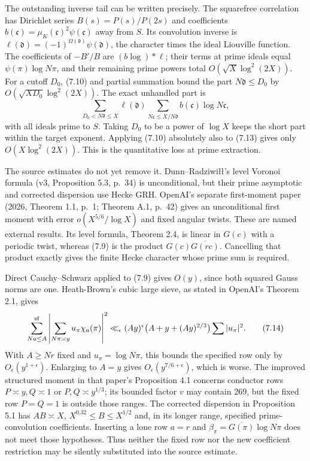 \documentclass[11pt]{article}
\begin{document}
The outstanding inverse tail can be written precisely. The squarefree correlation has Dirichlet series $B(s)=P(s)/P(2s)$ and coefficients $b(\mathfrak c)=\mu_K(\mathfrak c)^2\psi(\mathfrak c)$ away from $S$. Its convolution inverse is $\ell(\mathfrak d)=(-1)^{\Omega(\mathfrak d)}\psi(\mathfrak d)$, the character times the ideal Liouville function. The coefficients of $-B'/B$ are $(b\log)*\ell$; their terms at prime ideals equal $\psi(\pi)\log N\pi$, and their remaining prime powers total $O(\sqrt X\log^2(2X))$. For a cutoff $D_0$, (7.10) and partial summation bound the part $N\mathfrak d\le D_0$ by $O(\sqrt{XD_0}\log^2(2X))$. The exact unhandled part is
\[
 \sum_{D_0<N\mathfrak d\le X}\ell(\mathfrak d)
       \sum_{N\mathfrak c\le X/N\mathfrak d}
             b(\mathfrak c)\log N\mathfrak c,
 \tag{7.13}
\]
with all ideals prime to $S$. Taking $D_0$ to be a power of $\log X$ keeps the short part within the target exponent. Applying (7.10) absolutely also to (7.13) gives only $O(X\log^2(2X))$. This is the quantitative loss at prime extraction.

The source estimates do not yet remove it. Dunn--Radziwi\l\l's level Voronoi formula (v3, Proposition 5.3, p.~34) is unconditional, but their prime asymptotic and corrected dispersion use Hecke GRH. OpenAI's separate first-moment paper (2026, Theorem 1.1, p.~1; Theorem A.1, p.~42) gives an unconditional first moment with error $o(X^{5/6}/\log X)$ and fixed angular twists. These are named external results. Its level formula, Theorem 2.4, is linear in $G(c)$ with a periodic twist, whereas (7.9) is the product $G(c)\overline{G(rc)}$. Cancelling that product exactly gives the finite Hecke character whose prime sum is required.

Direct Cauchy--Schwarz applied to (7.9) gives $O(y)$, since both squared Gauss norms are one. Heath-Brown's cubic large sieve, as stated in OpenAI's Theorem 2.1, gives
\[
 \sum_{Na\le A}^{\rm sf}\left|\sum_{N\pi\asymp y}u_\pi\chi_a(\pi)\right|^2
   \ll_\epsilon(Ay)^\epsilon\bigl(A+y+(Ay)^{2/3}\bigr)\sum|u_\pi|^2.
 \tag{7.14}
\]
With $A\ge Nr$ fixed and $u_\pi=\log N\pi$, this bounds the specified row only by $O_\epsilon(y^{1+\epsilon})$. Enlarging to $A=y$ gives $O_\epsilon(y^{7/6+\epsilon})$, which is worse. The improved structured moment in that paper's Proposition 4.1 concerns conductor rows $P\asymp y,Q\asymp1$ or $P,Q\asymp y^{1/3}$; its bounded factor $v$ may contain 269, but the fixed row $P=Q=1$ is outside those ranges. The corrected dispersion in Proposition 5.1 has $AB\asymp X$, $X^{0.32}\le B\le X^{1/2}$ and, in its longer range, specified prime-convolution coefficients. Inserting a lone row $a=r$ and $\beta_\pi=\overline{G(\pi)}\log N\pi$ does not meet those hypotheses. Thus neither the fixed row nor the new coefficient restriction may be silently substituted into the source estimate.
\end{document}
